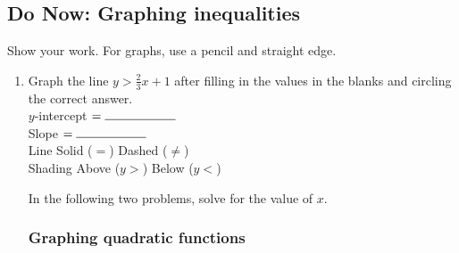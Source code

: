 \documentclass[12pt, oneside]{article}
\begin{document}
\subsection*{Do Now: Graphing inequalities}
Show your work. For graphs, use a pencil and straight edge.
  \begin{enumerate}

    \item Graph the line $y>\frac{2}{3} x +1$ after filling in the values in the blanks and circling the correct answer.\\[0.5cm]
          $y$-intercept $= \rule{2cm}{0.15mm}$ \\[0.5cm]
          Slope \hspace{0.7cm} $= \rule{2cm}{0.15mm}$\\[0.5cm]
          Line \hspace{1.5cm} Solid ($=$) \hspace{0.5cm} Dashed ($\neq$)\\[0.5cm]
          Shading \hspace{0.8cm} Above ($y>$) \hspace{0.5cm} Below ($y<$)\\
    \begin{center} %
    \end{center}

    In the following two problems, solve for the value of $x$.

    \newpage

\subsubsection*{Graphing quadratic functions}


\end{enumerate}
\end{document}
